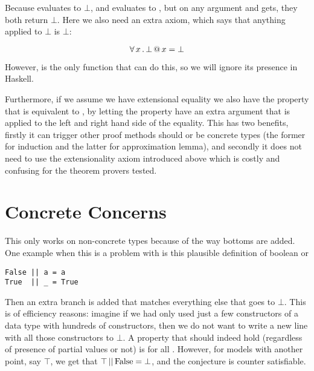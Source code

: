 Because  evaluates to $\bot$, and  evaluates
to \hs{()}, but on any argument  and  gets, they both
return $\bot$. Here we also need an extra axiom, which says that
anything applied to $\bot$ is $\bot$:

\begin{equation*}
\forall \, x \, . \, \bot \, @ \, x = \bot
\end{equation*}

However,  is the only function that can do this, so we will
ignore its presence in Haskell.

Furthermore, if we assume we have extensional equality we also have
the property that  is equivalent to
, by letting the property have an extra argument that
is applied to the left and right hand side of the equality. This has
two benefits, firstly it can trigger other proof methods should 
or  be concrete types (the former for induction and the latter
for approximation lemma), and secondly it does not need to use the
extensionality axiom introduced above which is costly and confusing
for the theorem provers tested.

\section{Concrete Concerns}

This only works on non-concrete types because of the way bottoms are
added. One example when this is a problem with is this plausible
definition of boolean or

\begin{verbatim}
False || a = a
True  || _ = True
\end{verbatim}

Then an extra branch is added that matches everything else that goes
to $\bot$. This is of efficiency reasons: imagine if we had only used
just a few constructors of a data type with hundreds of constructors,
then we do not want to write a new line with all those constructors to
$\bot$. A property that should indeed hold (regardless of presence of
partial values or not) is  for all
. However, for models with another point, say $\top$, we get
that $\top \, \mathrm{||} \, \mathrm{False} = \bot$, and the conjecture is
counter satisfiable.

